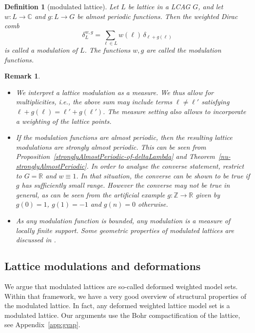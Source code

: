 \documentclass[11pt, a4wide]{amsart}
\newtheorem{definition}[lemma]{Definition}
\newtheorem{remark}[lemma]{Remark}
\numberwithin{lemma}{section}
\begin{document}
\begin{definition}[modulated lattice]\label{def:modlat} Let $L$ be lattice in a LCAG $G$, and let $w:L\to \mathbb C$ and $g: L \to G$ be almost periodic functions. Then the weighted Dirac comb
%
\[\delta_L^{w,g}=\sum_{\ell\in L} w(\ell)\, \delta_{\ell+g(\ell)}\]
%
is called a \emph{modulation} of $L$. The functions $w,g$ are called the \emph{modulation functions}.
\end{definition}

\begin{remark}\label{rem:mult}
\begin{itemize}
\item[(i)] We interpret a lattice modulation as a measure. We thus allow for multiplicities, i.e., the above sum may include terms $\ell\ne  \ell'$ satisfying $\ell+g(\ell)=\ell'+g(\ell')$. The measure setting also allows to incorporate a weighting of the lattice points.
\item[(ii)] If the modulation functions are almost periodic, then the resulting lattice modulations are strongly almost periodic. This can be seen from Proposition~\ref{stronglyAlmostPeriodic-of-deltaLambda} and Theorem~\ref{nu-stronglyAlmostPeriodic}. In order to analyse the converse statement, restrict to $G=\mathbb R$ and $w\equiv1$.  In that situation, the converse can be shown to be true if $g$ has sufficiently small range. However the converse may not be true in general, as can be seen from the artificial example $g:\mathbb Z\to \mathbb R$ given by $g(0)=1$, $g(1)=-1$ and $g(n)=0$ otherwise. 
\item[(iii)] As any modulation function is bounded, any modulation is a measure of locally finite support. Some geometric properties of modulated lattices are discussed in \cite[Ex.~3.10]{FR14}.
\end{itemize}
\end{remark}



\subsection{Lattice modulations and deformations}

We argue that modulated lattices are so-called deformed weighted model sets. Within that framework, we have a very good overview of structural properties of the modulated lattice.  In fact, any deformed weighted lattice model set is a modulated lattice. Our arguments use the Bohr compactification of the lattice, see Appendix~\ref{app:gvap}.
\end{document}
